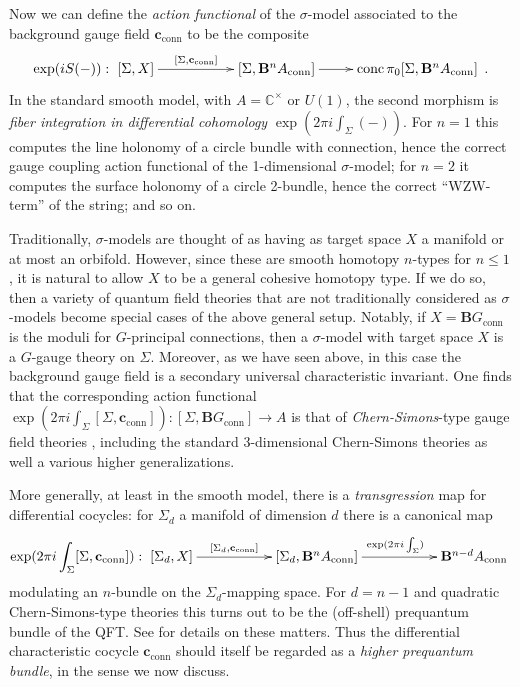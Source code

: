 \documentclass[copyright,12pt]{eptcs}
\begin{document}
Now we can define the \emph{action functional} of the $\sigma$-model associated
to the background gauge field $\mathbf{c}_{\mathrm{conn}}$ to be the composite
$$
  \exp(i S(-))
    :
  \xymatrix{
    [\Sigma, X]
  \ar[rr]^-{[\Sigma, \mathbf{c}_{\mathrm{conn}}]}
  &&
  [\Sigma, \mathbf{B}^n A_{\mathrm{conn}}]
  \ar[r]
  &
  \mathrm{conc}\,\pi_0 [\Sigma, \mathbf{B}^n A_{\mathrm{conn}}]
  }
  \,.
$$
In the standard smooth model, with $A = \mathbb{C}^\times$ or
$U(1)$, the second morphism is \emph{fiber integration in differential cohomology}
$\exp(2 \pi i \int_{\Sigma}(-))$.
For $n = 1$ this computes the line holonomy of a circle bundle with connection,
hence the correct gauge coupling action functional of the 1-dimensional $\sigma$-model; for
$n = 2$ it computes the surface holonomy of a circle 2-bundle, hence the
correct ``WZW-term'' of the string; and so on.

Traditionally, $\sigma$-models are thought of as having as target space $X$ a manifold
or at most an orbifold. However, since these are smooth homotopy $n$-types for $n \leq 1$, it is natural to
allow $X$ to be a general cohesive homotopy type.
If we do so, then a variety of
quantum field theories that are not traditionally considered as $\sigma$-models become
special cases of the above general setup.
Notably, if $X = \mathbf{B}G_{\mathrm{conn}}$ is
the moduli for $G$-principal connections, then a $\sigma$-model with target space $X$ is
a $G$-gauge theory on $\Sigma$. Moreover, as we have seen above, in this case the background
gauge field is a secondary universal characteristic invariant. One finds that the corresponding
action functional
$
 \exp(2 \pi i \int_\Sigma [\Sigma, \mathbf{c}_{\mathrm{conn}}])
 : [\Sigma, \mathbf{B}G_{\mathrm{conn}}] \to A
$
is that of \emph{Chern-Simons}-type gauge field theories \cite{FSS, CS},
including the standard 3-dimensional Chern-Simons theories as well a
various higher generalizations.

More generally, at least in the smooth model, there is a \emph{transgression} map for
differential cocycles: for
$\Sigma_d$ a manifold of dimension $d$ there is a canonical map
$$
  \exp(2 \pi i \int_{\Sigma}[\Sigma,\mathbf{c}_{\mathrm{conn}}])
  :
  \xymatrix{
    [\Sigma_d, X]
  \ar[rr]^-{[\Sigma_d, \mathbf{c}_{\mathrm{conn}}]}
  &&
  [\Sigma_d, \mathbf{B}^n A_{\mathrm{conn}}]
  \ar[rr]^{\exp(2 \pi i \int_\Sigma)}
  &&
  \mathbf{B}^{n-d} A_{\mathrm{conn}}
  }
$$
modulating an $n$-bundle on the $\Sigma_d$-mapping space. For $d = n-1$ and
quadratic Chern-Simons-type theories this turns out to be the (off-shell)
prequantum bundle of the QFT. See \cite{FSS} for details on these matters.
Thus the differential characteristic
cocycle $\mathbf{c}_{\mathrm{conn}}$ should itself be regarded as a
\emph{higher prequantum bundle}, in the sense we now discuss.
\end{document}
